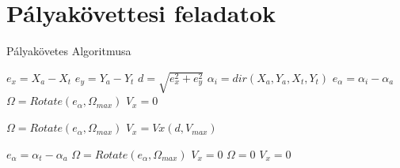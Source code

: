 \section{Pályakövettesi feladatok}

\begin{algorithm}
   \caption{Pályakövetes Algoritmusa}
    \begin{algorithmic}[1]
      
       \State $e_x = X_a-X_t$
       \State $e_y = Y_a-Y_t$
       \State $d=\sqrt{e_x^2+e_y^2}$
       \State $\alpha_i=dir(X_a,Y_a,X_t,Y_t)$ 
       \State $e_\alpha=\alpha_i-\alpha_a$
             
                \State $\Omega = Rotate(e_\alpha,\Omega_{max}) $
                \State $V_x = 0 $
            \Else {}
                
                \State $\Omega = Rotate(e_\alpha,\Omega_{max}) $
                \State $V_x = Vx(d,V_{max}) $
            \EndIf
       \Else {}
            
            \State $e_\alpha=\alpha_t-\alpha_a$
             
                \State $\Omega =Rotate(e_\alpha,\Omega_{max}) $
                \State $V_x = 0 $
            \Else {}
                \State $\Omega = 0$
                \State $V_x = 0 $
            \EndIf
       \EndIf
        
       \EndFunction

\end{algorithmic}
\end{algorithm}